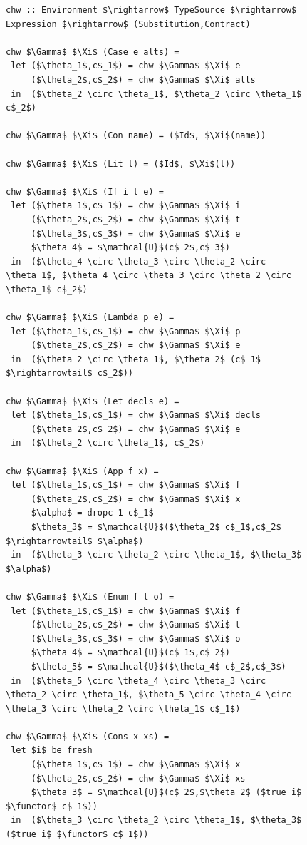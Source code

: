 \documentclass[10pt]{report}
\makeatletter
\newcommand{\functor}{<\!\!\!@\!\!\!>}
\makeatother
\begin{document}
\begin{figure}[htbp]
\begin{lstlisting}[mathescape]
chw :: Environment $\rightarrow$ TypeSource $\rightarrow$ Expression $\rightarrow$ (Substitution,Contract)

chw $\Gamma$ $\Xi$ (Case e alts) = 
 let ($\theta_1$,c$_1$) = chw $\Gamma$ $\Xi$ e
     ($\theta_2$,c$_2$) = chw $\Gamma$ $\Xi$ alts
 in  ($\theta_2 \circ \theta_1$, $\theta_2 \circ \theta_1$ c$_2$)
 
chw $\Gamma$ $\Xi$ (Con name) = ($Id$, $\Xi$(name))

chw $\Gamma$ $\Xi$ (Lit l) = ($Id$, $\Xi$(l))

chw $\Gamma$ $\Xi$ (If i t e) = 
 let ($\theta_1$,c$_1$) = chw $\Gamma$ $\Xi$ i
     ($\theta_2$,c$_2$) = chw $\Gamma$ $\Xi$ t
     ($\theta_3$,c$_3$) = chw $\Gamma$ $\Xi$ e
     $\theta_4$ = $\mathcal{U}$(c$_2$,c$_3$)
 in  ($\theta_4 \circ \theta_3 \circ \theta_2 \circ \theta_1$, $\theta_4 \circ \theta_3 \circ \theta_2 \circ \theta_1$ c$_2$)
 
chw $\Gamma$ $\Xi$ (Lambda p e) = 
 let ($\theta_1$,c$_1$) = chw $\Gamma$ $\Xi$ p
     ($\theta_2$,c$_2$) = chw $\Gamma$ $\Xi$ e
 in  ($\theta_2 \circ \theta_1$, $\theta_2$ (c$_1$ $\rightarrowtail$ c$_2$))
 
chw $\Gamma$ $\Xi$ (Let decls e) = 
 let ($\theta_1$,c$_1$) = chw $\Gamma$ $\Xi$ decls
     ($\theta_2$,c$_2$) = chw $\Gamma$ $\Xi$ e
 in  ($\theta_2 \circ \theta_1$, c$_2$)
 
chw $\Gamma$ $\Xi$ (App f x) = 
 let ($\theta_1$,c$_1$) = chw $\Gamma$ $\Xi$ f
     ($\theta_2$,c$_2$) = chw $\Gamma$ $\Xi$ x
     $\alpha$ = dropc 1 c$_1$
     $\theta_3$ = $\mathcal{U}$($\theta_2$ c$_1$,c$_2$ $\rightarrowtail$ $\alpha$)
 in  ($\theta_3 \circ \theta_2 \circ \theta_1$, $\theta_3$ $\alpha$)

chw $\Gamma$ $\Xi$ (Enum f t o) = 
 let ($\theta_1$,c$_1$) = chw $\Gamma$ $\Xi$ f
     ($\theta_2$,c$_2$) = chw $\Gamma$ $\Xi$ t
     ($\theta_3$,c$_3$) = chw $\Gamma$ $\Xi$ o
     $\theta_4$ = $\mathcal{U}$(c$_1$,c$_2$)
     $\theta_5$ = $\mathcal{U}$($\theta_4$ c$_2$,c$_3$)
 in  ($\theta_5 \circ \theta_4 \circ \theta_3 \circ \theta_2 \circ \theta_1$, $\theta_5 \circ \theta_4 \circ \theta_3 \circ \theta_2 \circ \theta_1$ c$_1$)
 
chw $\Gamma$ $\Xi$ (Cons x xs) =
 let $i$ be fresh
     ($\theta_1$,c$_1$) = chw $\Gamma$ $\Xi$ x
     ($\theta_2$,c$_2$) = chw $\Gamma$ $\Xi$ xs
     $\theta_3$ = $\mathcal{U}$(c$_2$,$\theta_2$ ($true_i$ $\functor$ c$_1$))
 in  ($\theta_3 \circ \theta_2 \circ \theta_1$, $\theta_3$ ($true_i$ $\functor$ c$_1$))
     

\end{lstlisting}
\end{figure}
\end{document}
